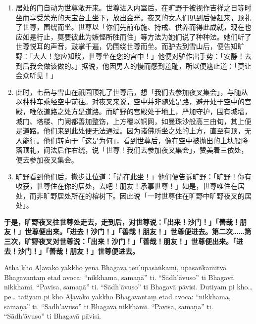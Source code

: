\begin{enumerate}
\item 居处的门自动为世尊敞开来。世尊进入内室后，在旷野于被视作吉祥之日等时坐而享受荣光的天宝台上坐下，放出金光。夜叉的女人们见到后便赶来，顶礼了世尊，围绕而坐。世尊以「你们先前布施、持戒、供养而得此成就，现在也应如是行止，莫要彼此为嫉悭所胜而住」等方法为她们说了种种法。她们听了世尊悦耳的声音，鼓掌千遍，仍围绕世尊而坐。而驴去到雪山后，便告知旷野：「大人！您应知晓，世尊坐在您的宫中！」他便对驴作出手势：「安静！去到后我会做该做的。」据说，他因男人的慢而感到羞耻，所以便遮止道：「莫让会众听见！」
\item 此时，七岳与雪山在祇园顶礼了世尊后，想「我们去参加夜叉集会」，与随从以种种车乘经空中前往。对夜叉来说，空中并非随处是路，避开处于空中的宫殿，唯依道路之处方是道路。而旷野的宫殿处于地上，严加守护，围有城墙，城门、塔楼、门阙都善加整饬，上方覆以铜网，如曼珠沙般高三由旬，其上便是道路。他们来到此处便无法通过。因为诸佛所坐之处的上方，直至有顶，无人能行。他们转向于「这是为何」，看到世尊后，像在空中被抛出的土块般降落顶礼，闻法后作右绕，说「世尊！我们去参加夜叉集会」，赞美着三依处，便去参加夜叉集会。
\item 旷野看到他们后，撤步让位道：「请在此坐！」他们便告诉旷野：「旷野！你有收获，世尊住在你的居处，去吧！朋友！承事世尊！」如是，世尊唯住在居处，而非旷野居处所在的榕树下。因此说「一时世尊住在旷野中旷野夜叉的居处」。\end{enumerate}

\textbf{于是，旷野夜叉往世尊处走去，走到后，对世尊说：「出来！沙门！」「善哉！朋友！」世尊便出来。「进去！沙门！」「善哉！朋友！」世尊便进去。第二次……第三次，旷野夜叉对世尊说：「出来！沙门！」「善哉！朋友！」世尊便出来。「进去！沙门！」「善哉！朋友！」世尊便进去。}

Atha kho Āḷavako yakkho yena Bhagavā ten’upasaṅkami, upasaṅkamitvā Bhagavantaṃ etad avoca: “nikkhama, samaṇā” ti. “Sādh’āvuso” ti Bhagavā nikkhami. “Pavisa, samaṇā” ti. “Sādh’āvuso” ti Bhagavā pāvisi. Dutiyam pi kho…pe… tatiyam pi kho Āḷavako yakkho Bhagavantaṃ etad avoca: “nikkhama, samaṇā” ti. “Sādh’āvuso” ti Bhagavā nikkhami. “Pavisa, samaṇā” ti. “Sādh’āvuso” ti Bhagavā pāvisi.

